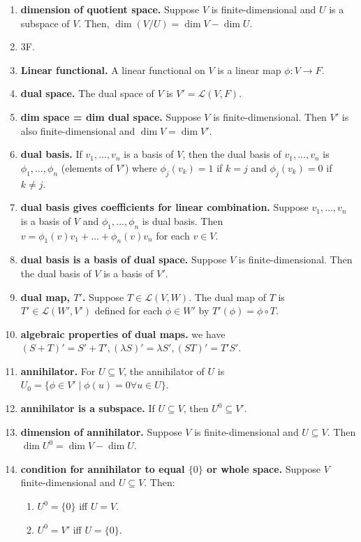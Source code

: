 \begin{enumerate}
	\item \textbf{dimension of quotient space. } Suppose $V$ is finite-dimensional and $U$ is a subspace of $V$. Then, $\dim (V/U) = \dim V - \dim U$.
	\item 3F. 
	\item \textbf{Linear functional. } A linear functional on $V$ is a linear map $\phi: V \to F$. 
	\item \textbf{dual space. } The dual space of $V$ is $V' = \mathscr{L}(V, F)$. 
	\item \textbf{dim space = dim dual space. } Suppose $V$ is finite-dimensional. Then $V'$ is also finite-dimensional and $\dim V = \dim V'$. 
	\item \textbf{dual basis. } If $v_1,\dots, v_n$ is a basis of $V$, then the dual basis of $v_1,\dots,v_n$ is $\phi_1,\dots,\phi_n$ (elements of $V'$) where $\phi_j(v_k) = 1$ if $k=j$ and $\phi_j(v_k)=0$ if $k \neq j$. 
	\item \textbf{dual basis gives coefficients for linear combination. } Suppose $v_1,\dots,v_n$ is a basis of $V$ and $\phi_1,\dots,\phi_n$ is dual basis. Then $v=\phi_1(v)v_1 + \dots + \phi_n(v)v_n$ for each $v \in V$. 
	\item \textbf{dual basis is a basis of dual space. } Suppose $V$ is finite-dimensional. Then the dual basis of $V$ is a basis of $V'$. 
	\item \textbf{dual map, $T'$. } Suppose $T \in \mathscr{L}(V,W)$. The dual map of $T$ is $T' \in \mathscr{L}(W', V')$ defined for each $\phi \in W'$ by $T'(\phi) = \phi \circ T$. 
	\item \textbf{algebraic properties of dual maps. } we have $(S + T)' = S' + T', (\lambda S)' = \lambda S', (ST)' = T'S'$. 
	\item \textbf{annihilator. } For $U \subseteq V$, the annihilator of $U$ is $U_0 = \{\phi \in V' \mid \phi(u) = 0 \forall u \in U\}$. 
	\item \textbf{annihilator is a subspace. } If $U \subseteq V$, then $U^0 \subseteq V'$. 
	\item \textbf{dimension of annihilator. } Suppose $V$ is finite-dimensional and $U \subseteq V$. Then $\dim U^0 = \dim V - \dim U$. 
	\item \textbf{condition for annihilator to equal $\{0\}$ or whole space. } Suppose $V$ finite-dimensional and $U \subseteq V$. Then: 
	\begin{enumerate}
		\item $U^0 = \{0\}$ iff $U=V$. 
		\item $U^0 = V'$ iff $U = \{0\}$. 

\end{enumerate}
\end{enumerate}
